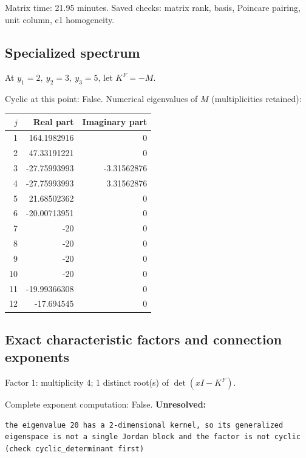 \documentclass[10pt,a4paper]{article}
\newcommand{\fitmath}[1]{\sbox{\mathbox}{$\displaystyle #1$}\ifdim\wd\mathbox>\linewidth\resizebox{\linewidth}{!}{\usebox{\mathbox}}\else\usebox{\mathbox}\fi}
\begin{document}
Matrix time: 21.95 minutes. Saved checks: matrix rank, basis, Poincare pairing, unit column, c1 homogeneity.
\subsection*{Specialized spectrum}
At $y_1=2,\ y_2=3,\ y_3=5$, let $K^F=-M$.
\begin{center}\fitmath{\Delta=0}\end{center}
Cyclic at this point: False.
Numerical eigenvalues of $M$ (multiplicities retained):
\begin{center}\small\begin{tabular}{rrr}\toprule $j$ & Real part & Imaginary part\\\midrule
1 & 164.1982916 & 0\\
2 & 47.33191221 & 0\\
3 & -27.75993993 & -3.31562876\\
4 & -27.75993993 & 3.31562876\\
5 & 21.68502362 & 0\\
6 & -20.00713951 & 0\\
7 & -20 & 0\\
8 & -20 & 0\\
9 & -20 & 0\\
10 & -20 & 0\\
11 & -19.99366308 & 0\\
12 & -17.694545 & 0\\
\bottomrule\end{tabular}\end{center}
\subsection*{Exact characteristic factors and connection exponents}
Factor 1: multiplicity 4; 1 distinct root(s) of $\det(xI-K^F)$.
\begin{center}\fitmath{\begin{aligned}p_{1}(x)&=x - 20\end{aligned}}\end{center}
Complete exponent computation: False.
\textbf{Unresolved:}

\begin{lstlisting}
the eigenvalue 20 has a 2-dimensional kernel, so its generalized eigenspace is not a single Jordan block and the factor is not cyclic (check cyclic_determinant first)
\end{lstlisting}
\end{document}
